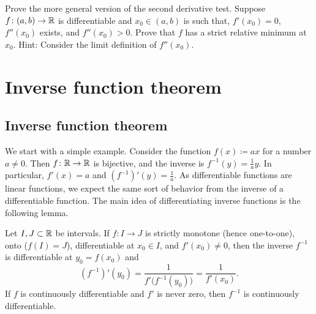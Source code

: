 \begin{exercise}
Prove the more general version of the second derivative test.
Suppose $f \colon (a,b) \to {\mathbb{R}}$ is differentiable and $x_0 \in (a,b)$
is such that, $f'(x_0) = 0$, $f''(x_0)$ exists, and $f''(x_0) > 0$.
Prove that $f$ has a strict relative
minimum at $x_0$.  Hint: Consider the limit definition of $f''(x_0)$.
\end{exercise}


\sectionnewpage
\section{Inverse function theorem}
\label{sec:ift}



\subsection{Inverse function theorem}

We start with a simple example.  Consider the function $f(x) \coloneqq a x$ for a
number $a \not= 0$.  Then $f \colon {\mathbb{R}} \to {\mathbb{R}}$ is bijective, and the inverse
is $f^{-1}(y) = \frac{1}{a} y$.  In particular, $f'(x) = a$ and 
$(f^{-1})'(y) = \frac{1}{a}$.  As differentiable functions are
 linear functions, we expect the same
sort of behavior from the inverse of a differentiable function.
The main idea of differentiating inverse functions is the following lemma.

\begin{lemma} \label{lemma:ift}
Let $I,J \subset {\mathbb{R}}$ be intervals.
If $f \colon I \to J$ is strictly monotone (hence one-to-one),
onto ($f(I) = J$),
differentiable at $x_0 \in I$, and $f'(x_0) \not= 0$,
then the inverse 
$f^{-1}$ is differentiable at $y_0 = f(x_0)$ and
\begin{equation*}
(f^{-1})'(y_0) = \frac{1}{f'\bigl( f^{-1}(y_0) \bigr)} = \frac{1}{f'(x_0)} .
\end{equation*}
If $f$ is continuously differentiable and $f'$ is never zero, then $f^{-1}$
is continuously differentiable.
\end{lemma}

